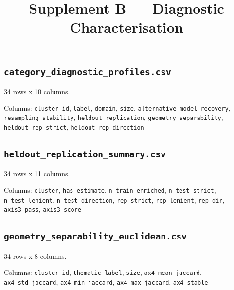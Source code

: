 \documentclass[10pt,a4paper]{article}
\title{\vspace{-14mm}\large Supplement B --- Diagnostic Characterisation}
\author{}\date{}
\begin{document}
\maketitle\thispagestyle{fancy}
\subsection*{\texttt{category\_\allowbreak{}diagnostic\_\allowbreak{}profiles.csv}}
34 rows x 10 columns.

{\raggedright Columns: \texttt{cluster\_\allowbreak{}id}, \texttt{label}, \texttt{domain}, \texttt{size}, \texttt{alternative\_\allowbreak{}model\_\allowbreak{}recovery}, \texttt{resampling\_\allowbreak{}stability}, \texttt{heldout\_\allowbreak{}replication}, \texttt{geometry\_\allowbreak{}separability}, \texttt{heldout\_\allowbreak{}rep\_\allowbreak{}strict}, \texttt{heldout\_\allowbreak{}rep\_\allowbreak{}direction}\par}

\subsection*{\texttt{heldout\_\allowbreak{}replication\_\allowbreak{}summary.csv}}
34 rows x 11 columns.

{\raggedright Columns: \texttt{cluster}, \texttt{has\_\allowbreak{}estimate}, \texttt{n\_\allowbreak{}train\_\allowbreak{}enriched}, \texttt{n\_\allowbreak{}test\_\allowbreak{}strict}, \texttt{n\_\allowbreak{}test\_\allowbreak{}lenient}, \texttt{n\_\allowbreak{}test\_\allowbreak{}direction}, \texttt{rep\_\allowbreak{}strict}, \texttt{rep\_\allowbreak{}lenient}, \texttt{rep\_\allowbreak{}dir}, \texttt{axis3\_\allowbreak{}pass}, \texttt{axis3\_\allowbreak{}score}\par}

\subsection*{\texttt{geometry\_\allowbreak{}separability\_\allowbreak{}euclidean.csv}}
34 rows x 8 columns.

{\raggedright Columns: \texttt{cluster\_\allowbreak{}id}, \texttt{thematic\_\allowbreak{}label}, \texttt{size}, \texttt{ax4\_\allowbreak{}mean\_\allowbreak{}jaccard}, \texttt{ax4\_\allowbreak{}std\_\allowbreak{}jaccard}, \texttt{ax4\_\allowbreak{}min\_\allowbreak{}jaccard}, \texttt{ax4\_\allowbreak{}max\_\allowbreak{}jaccard}, \texttt{ax4\_\allowbreak{}stable}\par}
\end{document}
